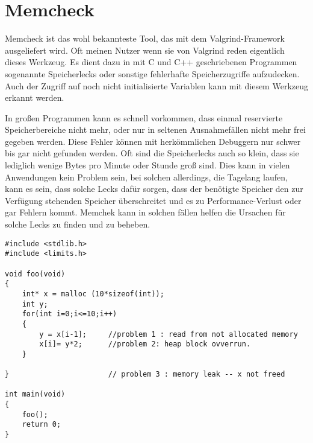 \section{Memcheck}
Memcheck ist das wohl bekannteste Tool, das mit dem Valgrind-Framework ausgeliefert wird. Oft meinen Nutzer wenn sie von Valgrind reden eigentlich dieses Werkzeug. Es dient dazu in mit C und C++ geschriebenen Programmen sogenannte Speicherlecks oder sonstige fehlerhafte Speicherzugriffe aufzudecken. Auch der Zugriff auf noch nicht initialisierte Variablen kann mit diesem Werkzeug erkannt werden.

In großen Programmen kann es schnell vorkommen, dass einmal reservierte Speicherbereiche nicht mehr, oder nur in seltenen Ausnahmefällen nicht mehr frei gegeben werden. Diese Fehler können mit herkömmlichen Debuggern nur schwer bis gar nicht gefunden werden. Oft sind die Speicherlecks auch so klein, dass sie lediglich wenige Bytes pro Minute oder Stunde groß sind. Dies kann in vielen Anwendungen kein Problem sein, bei solchen allerdings, die Tagelang laufen, kann es sein, dass solche Lecks dafür sorgen, dass der benötigte Speicher den zur Verfügung stehenden Speicher überschreitet und es zu Performance-Verlust oder gar Fehlern kommt. Memchek kann in solchen fällen helfen die Ursachen für solche Lecks zu finden und zu beheben.

\begin{lstlisting}
#include <stdlib.h>
#include <limits.h>

void foo(void)
{
	int* x = malloc (10*sizeof(int));
	int y;
	for(int i=0;i<=10;i++) 
	{
		y = x[i-1];		//problem 1 : read from not allocated memory
		x[i]= y*2;  	//problem 2: heap block ovverrun.
	}
	
}						// problem 3 : memory leak -- x not freed
	
int main(void)
{
	foo();
	return 0;
}
\end{lstlisting}